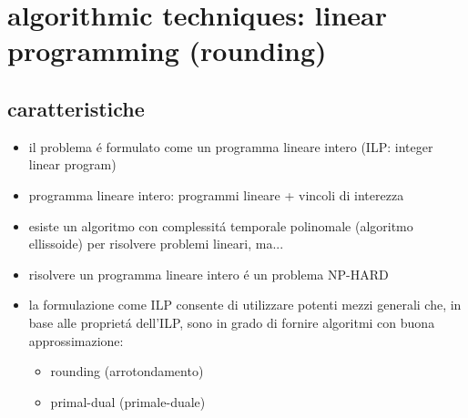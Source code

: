 \section*{algorithmic techniques: linear programming (rounding)}


\subsection*{caratteristiche}
\begin{flushleft}
	\begin{itemize}
		\item il problema \'e formulato come un programma lineare intero (ILP: integer linear program)
		\item programma lineare intero: programmi lineare + vincoli di interezza
		\item esiste un algoritmo con complessit\'a temporale polinomale (algoritmo ellissoide) per risolvere problemi lineari, ma...
		\item risolvere un programma lineare intero \'e un problema NP-HARD
		\item la formulazione come ILP consente di utilizzare potenti mezzi generali che, in base alle propriet\'a dell'ILP, sono in grado di fornire algoritmi con buona approssimazione:
		\begin{itemize}
			\item rounding (arrotondamento)
			\item primal-dual (primale-duale)
		\end{itemize}
	\end{itemize}
\end{flushleft}


